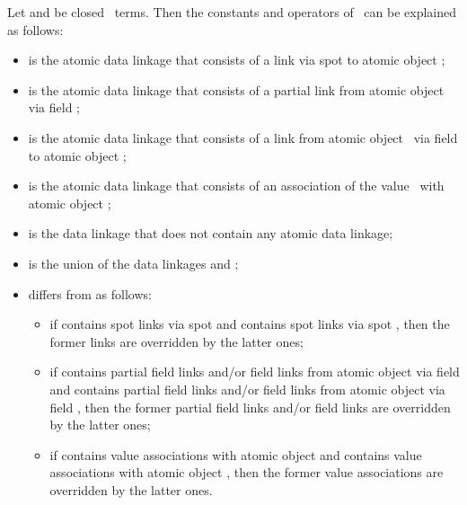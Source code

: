 \documentclass[fleqn]{llncs}
\begin{document}
Let  and  be closed \DLA\ terms.
Then the constants and operators of \DLA\ can be explained as follows:
\begin{itemize}
\item
 is the atomic data linkage that consists of a link via
spot  to atomic object ;
\item
 is the atomic data linkage that consists of a partial
link from atomic object  via field ;
\item
 is the atomic data linkage that consists of a link
from atomic object~ via field  to atomic object ;
\item
 is the atomic data linkage that consists of an
association of the value~ with atomic object ;
\item
 is the data linkage that does not contain any atomic data
linkage;
\item
 is the union of the data linkages  and ;
\item
 differs from  as follows:
\begin{itemize}
\item
if  contains spot links via spot  and  contains spot links via
spot , then the former links are overridden by the latter ones;
\item
if  contains partial field links and/or field links from atomic
object  via field  and  contains partial field links and/or
field links from atomic object  via field , then the former
partial field links and/or field links are overridden by the latter
ones;
\item
if  contains value associations with atomic object  and 
contains value associations with atomic object , then the former
value associations are overridden by the latter ones.
\end{itemize}
\end{itemize}
\end{document}
